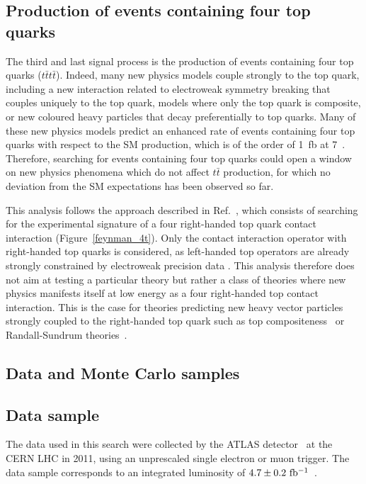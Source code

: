 \subsection{Production of events containing four top quarks}
The third and last signal process is the production of events containing four top quarks ($t\bar{t}t\bar{t}$). 
Indeed, many new physics models couple strongly to the top quark, including a new interaction 
related to electroweak symmetry breaking that couples uniquely to the top quark,
models where only the top quark is composite, 
or new coloured heavy particles that decay preferentially
to top quarks. Many of these new physics models predict an enhanced rate
of events containing four top quarks with respect to the SM production, which is of the order of 1~fb 
at 7~\TeV. Therefore, searching for events containing four top quarks could open
a window on new physics phenomena which do not affect $t\bar{t}$ production, for which
no deviation from the SM expectations has been observed so far.

This analysis follows the approach described in Ref.~\cite{Degrande:2010kt}, which consists of searching 
for the experimental signature of a four right-handed top quark contact interaction 
(Figure~\ref{feynman_4t}). Only the contact interaction operator with right-handed top quarks 
is considered, as left-handed top operators are already strongly constrained by electroweak precision 
data \cite{PhysRevD.51.3888}. This analysis therefore does not aim at testing a particular theory 
but rather a class of theories where new physics manifests itself at low energy as a four right-handed 
top contact interaction. This is the case for theories predicting new heavy vector particles strongly 
coupled to the right-handed top quark such as top 
compositeness~\cite{PhysRevD.78.074026,1126-6708-2008-04-087,1126-6708-2009-05-022} or 
Randall-Sundrum theories~\cite{Guchait:2007jd}.

\subsection{Data and Monte Carlo samples}\label{sect:samples}

\subsection{Data sample}
The data used in this search were collected by the ATLAS detector~\cite{1748-0221-3-08-S08003} 
at the CERN LHC in 2011, using an
unprescaled single electron or muon trigger. The data sample corresponds to an integrated luminosity of
$4.7\pm0.2~\mbox{fb$^{-1}$}{}$~\cite{Aad:2011dr,ATLAS-CONF-2011-116}.

